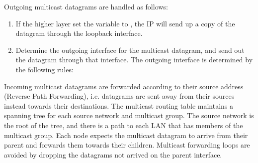 Outgoing multicast datagrams are handled as follows:
\begin{enumerate}
  \item If the higher layer set the  variable
  to , the IP will send up a copy of the datagram
  through the loopback interface.
  \item Determine the outgoing interface for the multicast datagram,
  and send out the datagram through that interface. The outgoing
  interface is determined by the following rules:
\end{enumerate}


Incoming multicast datagrams are forwarded according to their source address
(Reverse Path Forwarding), i.e. datagrams are sent away from their sources instead
towards their destinations. The multicast routing table maintains a spanning tree
for each source network and multicast group. The source network is the root of the
tree, and there is a path to each LAN that has members of the multicast group.
Each node expects the multicast datagram to arrive from their parent and forwards
them towards their children. Multicast forwarding loops are avoided by dropping the
datagrams not arrived on the parent interface.

